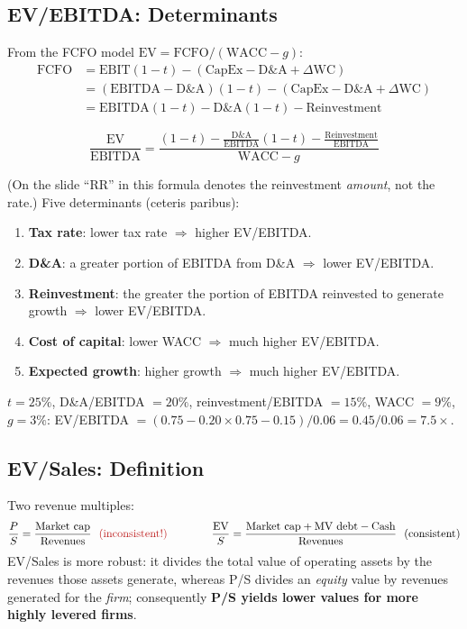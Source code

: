 \subsection{EV/EBITDA: Determinants}
From the FCFO model $\text{EV}=\text{FCFO}/(\text{WACC}-g)$:
\begin{align*}
\text{FCFO}&=\text{EBIT}(1-t)-(\text{CapEx}-\text{D\&A}+\Delta\text{WC})\\
&=(\text{EBITDA}-\text{D\&A})(1-t)-(\text{CapEx}-\text{D\&A}+\Delta\text{WC})\\&=\text{EBITDA}(1-t)-\text{D\&A}(1-t)-\text{Reinvestment}
\end{align*}
\begin{keybox}
\[
\frac{\text{EV}}{\text{EBITDA}}=\frac{(1-t)-\frac{\text{D\&A}}{\text{EBITDA}}(1-t)-\frac{\text{Reinvestment}}{\text{EBITDA}}}{\text{WACC}-g}
\]
\end{keybox}
(On the slide ``RR'' in this formula denotes the reinvestment \emph{amount}, not the rate.) Five determinants (ceteris paribus):
\begin{enumerate}
  \item \textbf{Tax rate}: lower tax rate $\Rightarrow$ higher EV/EBITDA.
  \item \textbf{D\&A}: a greater portion of EBITDA from D\&A $\Rightarrow$ lower EV/EBITDA.
  \item \textbf{Reinvestment}: the greater the portion of EBITDA reinvested to generate growth $\Rightarrow$ lower EV/EBITDA.
  \item \textbf{Cost of capital}: lower WACC $\Rightarrow$ much higher EV/EBITDA.
  \item \textbf{Expected growth}: higher growth $\Rightarrow$ much higher EV/EBITDA.
\end{enumerate}
\begin{exbox}
$t=25\%$, D\&A/EBITDA $=20\%$, reinvestment/EBITDA $=15\%$, WACC $=9\%$, $g=3\%$: EV/EBITDA $=(0.75-0.20\times0.75-0.15)/0.06=0.45/0.06=\mathbf{7.5\times}$.
\end{exbox}

\subsection{EV/Sales: Definition}
Two revenue multiples:
\[
\frac{P}{S}=\frac{\text{Market cap}}{\text{Revenues}}\ \ \textcolor{keyred}{(\text{inconsistent!})}\qquad\qquad \frac{\text{EV}}{S}=\frac{\text{Market cap}+\text{MV debt}-\text{Cash}}{\text{Revenues}}\ \ (\text{consistent})
\]
EV/Sales is more robust: it divides the total value of operating assets by the revenues those assets generate, whereas P/S divides an \emph{equity} value by revenues generated for the \emph{firm}; consequently \textbf{P/S yields lower values for more highly levered firms}.

